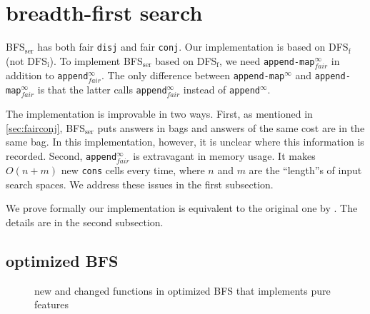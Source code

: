 \documentclass[format=acmlarge, review=true, authordraft=true]{acmart}
\newcommand{\conj}{\texttt{conj}}
\newcommand{\disj}{\texttt{disj}}
\newcommand{\DFSi }[0]{DFS$_\textrm{i}$}
\newcommand{\DFSf }[0]{DFS$_\textrm{f}$}
\newcommand{\BFSser}[0]{BFS$_\textrm{ser}$}
\begin{document}

\section{breadth-first search}

\BFSser{} has both fair \disj{} and fair \conj{}. Our implementation is based 
on \DFSf{} (not \DFSi{}). To implement \BFSser{} based on \DFSf{}, 
we need \texttt{append-map$^\infty_{fair}$} in addition to 
\texttt{append$^\infty_{fair}$}. 
The only difference between \texttt{append-map$^\infty$} and 
\texttt{append-map$^\infty_{fair}$} is that the latter calls 
\texttt{append$^\infty_{fair}$} instead of \texttt{append$^\infty$}.

The implementation is improvable in two ways. First, as mentioned in 
\autoref{sec:fairconj}, \BFSser{} puts answers in bags and answers of the same 
cost are in the 
same bag. In this implementation, however, it is unclear where this information 
is recorded. Second, \texttt{append$^\infty_{fair}$} is extravagant in memory 
usage. It 
makes $O(n+m)$ new \texttt{cons} cells every time, where $n$ and $m$ are the 
``length''s of input search spaces. We address these issues in the first 
subsection.


We prove formally our implementation is equivalent to the original one by 
\citet{seres1999algebra}. The details are in the second subsection.

\subsection{optimized BFS}

\begin{figure}
		
	\caption{new and changed functions in optimized BFS that implements pure 
	features}
	\label{BFS-opt}
\end{figure}

\end{document}

